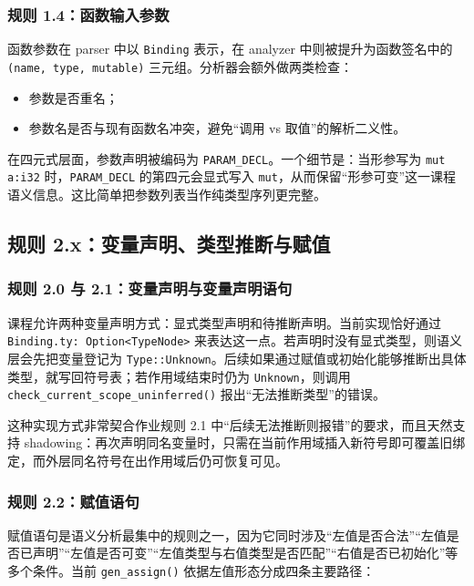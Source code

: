 \documentclass[UTF8,a4paper,12pt]{ctexart}
\newcommand{\pkg}[1]{\texttt{#1}}
\newcommand{\op}[1]{\texttt{#1}}
\begin{document}
\subsubsection{规则 1.4：函数输入参数}

函数参数在 parser 中以 \pkg{Binding} 表示，在 analyzer 中则被提升为函数签名中的 \pkg{(name, type, mutable)} 三元组。分析器会额外做两类检查：

\begin{itemize}
    \item 参数是否重名；
    \item 参数名是否与现有函数名冲突，避免“调用 vs 取值”的解析二义性。
\end{itemize}

在四元式层面，参数声明被编码为 \op{PARAM\_DECL}。一个细节是：当形参写为 \pkg{mut a:i32} 时，\op{PARAM\_DECL} 的第四元会显式写入 \pkg{mut}，从而保留“形参可变”这一课程语义信息。这比简单把参数列表当作纯类型序列更完整。

\subsection{规则 2.x：变量声明、类型推断与赋值}

\subsubsection{规则 2.0 与 2.1：变量声明与变量声明语句}

课程允许两种变量声明方式：显式类型声明和待推断声明。当前实现恰好通过 \pkg{Binding.ty: Option<TypeNode>} 来表达这一点。若声明时没有显式类型，则语义层会先把变量登记为 \pkg{Type::Unknown}。后续如果通过赋值或初始化能够推断出具体类型，就写回符号表；若作用域结束时仍为 \pkg{Unknown}，则调用 \pkg{check\_current\_scope\_uninferred()} 报出“无法推断类型”的错误。

这种实现方式非常契合作业规则 2.1 中“后续无法推断则报错”的要求，而且天然支持 shadowing：再次声明同名变量时，只需在当前作用域插入新符号即可覆盖旧绑定，而外层同名符号在出作用域后仍可恢复可见。

\subsubsection{规则 2.2：赋值语句}

赋值语句是语义分析最集中的规则之一，因为它同时涉及“左值是否合法”“左值是否已声明”“左值是否可变”“左值类型与右值类型是否匹配”“右值是否已初始化”等多个条件。当前 \pkg{gen\_assign()} 依据左值形态分成四条主要路径：
\end{document}
